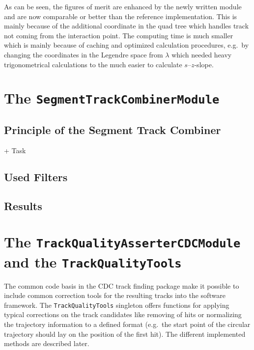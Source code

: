 As can be seen, the figures of merit are enhanced by the newly written module and are now comparable or better than the reference implementation. This is mainly because of the additional coordinate in the quad tree which handles track not coming from the interaction point. The computing time is much smaller which is mainly because of caching and optimized calculation procedures, e.g.\ by changing the coordinates in the Legendre space from $\lambda$ which needed heavy trigonometrical calculations to the much easier to calculate $s$--$z$-slope.

\section{The \texttt{SegmentTrackCombinerModule}} \label{section-combiner}
\subsection{Principle of the Segment Track Combiner}
+ Task
\subsection{Used Filters}
\subsection{Results}

\section{The \texttt{Track\-Quality\-Asserter\-CDC\-Module} and the \texttt{Track\-Quality\-Tools}}  \label{section-quality}

The common code basis in the CDC track finding package make it possible to include common correction tools for the resulting tracks into the software framework. The \texttt{Track\-Quality\-Tools} singleton offers functions for applying typical corrections on the track candidates like removing of hits or normalizing the trajectory information to a defined format (e.g.\ the start point of the circular trajectory should lay on the position of the first hit). The different implemented methods are described later.

